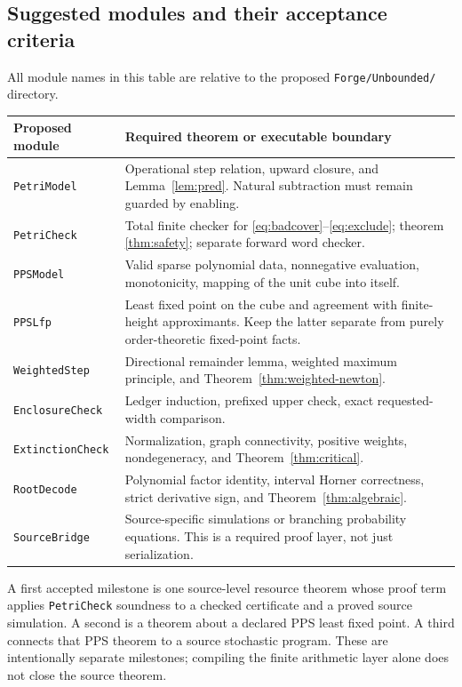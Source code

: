 \documentclass[11pt,a4paper]{article}
\theoremstyle{definition}\newtheorem{definition}[theorem]{Definition}
\theoremstyle{remark}\newtheorem{remark}[theorem]{Remark}
\newcommand{\code}[1]{\nolinkurl{#1}}
\begin{document}
\subsection{Suggested modules and their acceptance criteria}
All module names in this table are relative to the proposed \code{Forge/Unbounded/} directory.
\begin{longtable}{P{0.25\textwidth}P{0.64\textwidth}}
\toprule
Proposed module & Required theorem or executable boundary \\
\midrule
\code{PetriModel} & Operational step relation, upward closure, and Lemma~\ref{lem:pred}. Natural subtraction must remain guarded by enabling.\\[4pt]
\code{PetriCheck} & Total finite checker for \eqref{eq:badcover}--\eqref{eq:exclude}; theorem \ref{thm:safety}; separate forward word checker.\\[4pt]
\code{PPSModel} & Valid sparse polynomial data, nonnegative evaluation, monotonicity, mapping of the unit cube into itself.\\[4pt]
\code{PPSLfp} & Least fixed point on the cube and agreement with finite-height approximants. Keep the latter separate from purely order-theoretic fixed-point facts.\\[4pt]
\code{WeightedStep} & Directional remainder lemma, weighted maximum principle, and Theorem~\ref{thm:weighted-newton}.\\[4pt]
\code{EnclosureCheck} & Ledger induction, prefixed upper check, exact requested-width comparison.\\[4pt]
\code{ExtinctionCheck} & Normalization, graph connectivity, positive weights, nondegeneracy, and Theorem~\ref{thm:critical}.\\[4pt]
\code{RootDecode} & Polynomial factor identity, interval Horner correctness, strict derivative sign, and Theorem~\ref{thm:algebraic}.\\[4pt]
\code{SourceBridge} & Source-specific simulations or branching probability equations. This is a required proof layer, not just serialization.\\
\bottomrule
\end{longtable}

A first accepted milestone is one source-level resource theorem whose proof term applies \code{PetriCheck} soundness to a checked certificate and a proved source simulation. A second is a theorem about a declared PPS least fixed point. A third connects that PPS theorem to a source stochastic program. These are intentionally separate milestones; compiling the finite arithmetic layer alone does not close the source theorem.
\end{document}
